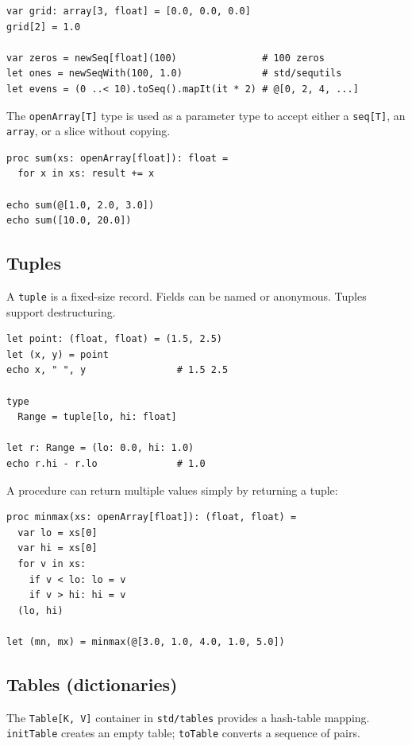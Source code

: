 \documentclass[justified, sixbynine]{tufte-book}
\def\ft{\small\tt}
\theoremstyle{plain}%
\newtheorem * {corollary}{Corollary}
\theoremstyle{definition}
\theoremstyle{remark}
\newtheorem * {remark}{Remark}
\newtheorem * {note}{Note}
\begin{document}
\begin{fullwidth}
\begin{lstlisting}
var grid: array[3, float] = [0.0, 0.0, 0.0]
grid[2] = 1.0

var zeros = newSeq[float](100)               # 100 zeros
let ones = newSeqWith(100, 1.0)              # std/sequtils
let evens = (0 ..< 10).toSeq().mapIt(it * 2) # @[0, 2, 4, ...]
\end{lstlisting}

The {\ft openArray[T]} type is used as a parameter type to accept either a {\ft seq[T]}, an {\ft array}, or a slice without copying.

\begin{lstlisting}
proc sum(xs: openArray[float]): float =
  for x in xs: result += x

echo sum(@[1.0, 2.0, 3.0])
echo sum([10.0, 20.0])
\end{lstlisting}

\goodbreak\subsection{Tuples}


A {\ft tuple} is a fixed-size record. Fields can be named or anonymous. Tuples support destructuring.

\begin{lstlisting}
let point: (float, float) = (1.5, 2.5)
let (x, y) = point
echo x, " ", y                # 1.5 2.5

type
  Range = tuple[lo, hi: float]

let r: Range = (lo: 0.0, hi: 1.0)
echo r.hi - r.lo              # 1.0
\end{lstlisting}

A procedure can return multiple values simply by returning a tuple:

\begin{lstlisting}
proc minmax(xs: openArray[float]): (float, float) =
  var lo = xs[0]
  var hi = xs[0]
  for v in xs:
    if v < lo: lo = v
    if v > hi: hi = v
  (lo, hi)

let (mn, mx) = minmax(@[3.0, 1.0, 4.0, 1.0, 5.0])
\end{lstlisting}

\goodbreak\subsection{Tables (dictionaries)}


The {\ft Table[K, V]} container in {\ft std/tables} provides a hash-table mapping. {\ft initTable} creates an empty table; {\ft toTable} converts a sequence of pairs.


\end{fullwidth}
\end{document}
